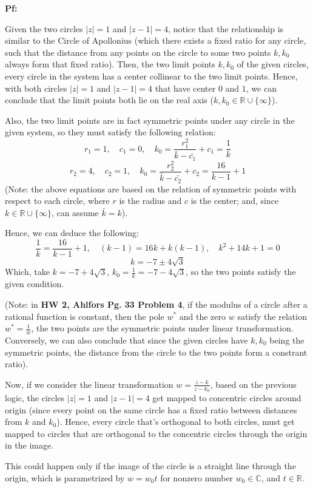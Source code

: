 \documentclass{article}
\begin{document}
\textbf{Pf:}

Given the two circles $|z|=1$ and $|z-1|=4$, notice that the relationship is similar to the Circle of Apollonius 
(which there exists a fixed ratio for any circle, such that the distance from any points on the circle to some two points $k,k_0$ always form that fixed ratio).
Then, the two limit points $k,k_0$ of the given circles, every circle in the system has a center collinear to the two limit points.
Hence, with both circles $|z|=1$ and $|z-1|=4$ that have center $0$ and $1$, we can conclude that the limit points both lie on the real axis ($k,k_0\in\mathbb{R}\cup\{\infty\}$).

\hfill

Also, the two limit points are in fact symmetric points under any circle in the given system, so they must satisfy the following relation:
$$r_1=1,\quad c_1=0,\quad k_0=\frac{r_1^2}{\bar{k}-\bar{c_1}}+c_1 = \frac{1}{k}$$
$$r_2=4,\quad c_2=1,\quad k_0=\frac{r_2^2}{\bar{k}-\bar{c_2}}+c_2=\frac{16}{k-1}+1$$
(Note: the above equations are based on the relation of symmetric points with respect to each circle, where $r$ is the radius and $c$ is the center; and, since $k\in\mathbb{R}\cup\{\infty\}$, can assume $\bar{k}=k$).

Hence, we can deduce the following:
$$\frac{1}{k}=\frac{16}{k-1}+1,\quad (k-1)=16k+k(k-1),\quad k^2+14k+1=0$$
$$k=-7\pm 4\sqrt{3}$$
Which, take $k=-7+4\sqrt{3}$, $k_0=\frac{1}{k}=-7-4\sqrt{3}$, so the two points satisfy the given condition.

(Note: in \textbf{HW 2, Ahlfors Pg. 33 Problem 4}, if the modulus of a circle after a rational function is constant,
then the pole $w^*$ and the zero $w$ satisfy the relation $w^*=\frac{1}{\bar{w}}$, the two points are the symmetric points under linear transformation.
Conversely, we can also conclude that since the given circles have $k,k_0$ being the symmetric points, the distance from the circle to the two points form a constrant ratio).

\hfill

Now, if we consider the linear transformation $w=\frac{z-k}{z-k_0}$, based on the previous logic, 
the circles $|z|=1$ and $|z-1|=4$ get mapped to concentric circles around origin (since every point on the same circle has a fixed ratio between distances from $k$ and $k_0$).
Hence, every circle that's orthogonal to both circles, must get mapped to circles that are orthogonal to the concentric circles through the origin in the image.

This could happen only if the image of the circle is a straight line through the origin, which is parametrized by $w=w_0t$ for nonzero number $w_0\in\mathbb{C}$, and $t\in\mathbb{R}$.
\end{document}
